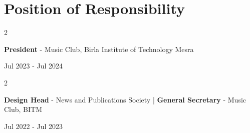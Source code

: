 \documentclass[10pt, letterpaper]{article}
\newenvironment{twocolentry}[2][]{
    \onecolentry
    \def\secondColumn{#2}
    \setcolumnwidth{\fill, 4.5 cm}
    \begin{paracol}{2}
}{
    \switchcolumn \raggedleft \secondColumn
    \end{paracol}
    \endonecolentry
}
\begin{document}
\section{Position of Responsibility}

\begin{twocolentry}{Jul 2023 - Jul 2024}
\textbf{President} - Music Club, Birla Institute of Technology Mesra
\end{twocolentry}

\begin{twocolentry}{Jul 2022 - Jul 2023}
\textbf{Design Head} - News and Publications Society | \textbf{General Secretary} - Music Club, BITM
\end{twocolentry}
\end{document}
